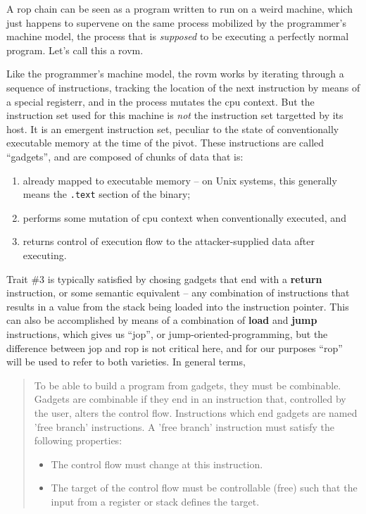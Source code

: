 \documentclass[12pt,glossary]{dalthesis}
\begin{document}
A \gls{rop} chain can be seen as a program written to run on a weird machine, which just
happens to supervene on the same process mobilized by the programmer's machine
model, the process that is \emph{supposed} to be executing a perfectly normal
program. Let's call this a \gls{rovm}.

Like the programmer's machine model, the \gls{rovm} works by iterating through a
sequence of instructions, tracking the location of the next instruction by means
of a special registerr, and in the process mutates the \gls{cpu} context. But the
instruction set used for this machine is \emph{not} the instruction set targetted by
its host. It is an emergent instruction set, peculiar to the state of
conventionally executable memory at the time of the pivot. These instructions
are called ``gadgets'', and are composed of chunks of data that is:

\begin{enumerate}
\item already mapped to executable memory -- on Unix systems, this
generally means the \texttt{.text} section of the binary;
\item performs some mutation of \gls{cpu} context when conventionally
executed, and
\item returns control of execution flow to the attacker-supplied data
after executing.
\end{enumerate}

Trait \#3 is typically satisfied by chosing gadgets that
end with a \textbf{return} instruction, or some semantic equivalent -- any combination
of instructions that results in a value from the stack being loaded into the
instruction pointer. This can also be accomplished by means of a combination of
\textbf{load} and \textbf{jump} instructions, which gives us ``\gls{jop}'', or
jump-oriented-programming, but the difference between \gls{jop} and \gls{rop} is not
critical here, and for our purposes ``\gls{rop}'' will be used to refer to both
varieties. In general terms, 

\begin{quote}
To be able to build a program from gadgets, they must be combinable. Gadgets
are combinable if they end in an instruction that, controlled by the user, 
alters the control flow. Instructions which end gadgets are named 'free branch'
instructions. A 'free branch' instruction must satisfy the following properties:

\begin{itemize}
\item The control flow must change at this instruction.

\item The target of the control flow must be controllable (free) such that the
input from a register or stack defines the target. \cite{kornau09}
\end{itemize}
\end{quote}
\end{document}
